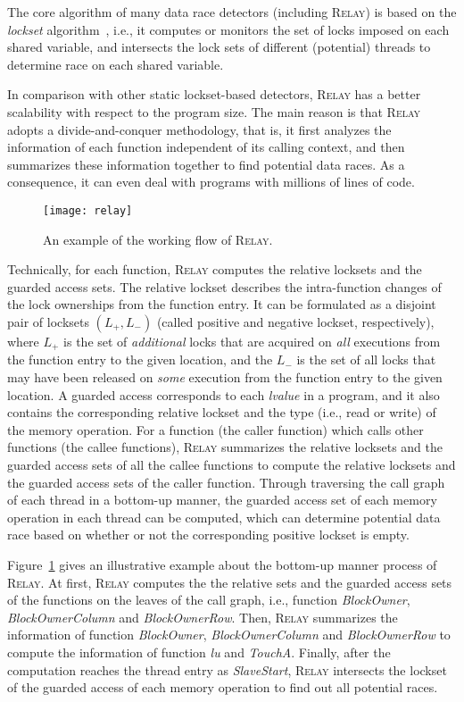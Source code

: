 \documentclass[10pt,onecolumn,letterpaper]{article}
\begin{document}
The core algorithm of many data race detectors (including
R\textsc{elay}) is based on the \emph{lockset}
algorithm~\cite{Savage97TCS}, i.e., it computes or monitors the set
of locks imposed on each shared variable, and intersects the lock
sets of different (potential) threads to determine race on each
shared variable.

In comparison with other static lockset-based detectors,
R\textsc{elay} has a better scalability with respect to the program
size. The main reason is that R\textsc{elay} adopts a
divide-and-conquer methodology, that is, it first analyzes the
information of each function independent of its calling context, and
then summarizes these information together to find potential data
races. As a consequence, it can even deal with programs with
millions of lines of code.

\begin{figure}
\centering
\texttt{[image: relay]}
\caption{An example of the working flow of
R\textsc{elay}.}\label{fig:relay}
\end{figure}

Technically, for each function, R\textsc{elay} computes the relative
locksets and the guarded access sets. The relative lockset describes
the intra-function changes of the lock ownerships from the function
entry. It can be formulated as a disjoint pair of locksets $(L_+,
L_-)$ (called positive and negative lockset, respectively), where
$L_+$ is the set of \emph{additional} locks that are acquired on
\emph{all} executions from the function entry to the given location,
and the $L_-$ is the set of all locks that may have been released on
\emph{some} execution from the function entry to the given location.
A guarded access corresponds to each \emph{lvalue} in a program, and
it also contains the corresponding relative lockset and the type
(i.e., read or write) of the memory operation. For a function (the
caller function) which calls other functions (the callee functions),
R\textsc{elay} summarizes the relative locksets and the guarded
access sets of all the callee functions to compute the relative
locksets and the guarded access sets of the caller function. Through
traversing the call graph of each thread in a bottom-up manner, the
guarded access set of each memory operation in each thread can be
computed, which can determine potential data race based on whether
or not the corresponding positive lockset is empty.


Figure~\ref{fig:relay} gives an illustrative example about the
bottom-up manner process of R\textsc{elay}. At first, R\textsc{elay}
computes the the relative sets and the guarded access sets of the
functions on the leaves of the call graph, i.e., function
\emph{BlockOwner}, \emph{BlockOwnerColumn} and \emph{BlockOwnerRow}.
Then, R\textsc{elay} summarizes the information of function
\emph{BlockOwner}, \emph{BlockOwnerColumn} and \emph{BlockOwnerRow}
to compute the information of function \emph{lu} and \emph{TouchA}.
Finally, after the computation reaches the thread entry as
\emph{SlaveStart}, R\textsc{elay} intersects the lockset of the
guarded access of each memory operation to find out all potential
races.
\end{document}
